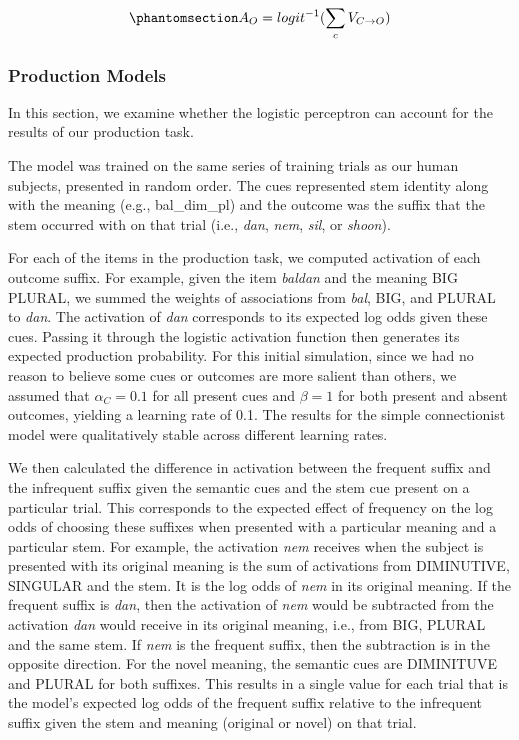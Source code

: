 \documentclass[
  letterpaper,
  DIV=11,
  numbers=noendperiod]{scrartcl}
\begin{document}
\begin{equation}\phantomsection\label{eq-rwlogistic}{
A_O = logit^{-1}(\sum_cV_{C\rightarrow O})
}\end{equation}

\subsubsection{Production Models}\label{production-models}

In this section, we examine whether the logistic perceptron can account
for the results of our production task.

The model was trained on the same series of training trials as our human
subjects, presented in random order. The cues represented stem identity
along with the meaning (e.g., bal\_dim\_pl) and the outcome was the
suffix that the stem occurred with on that trial (i.e., \emph{dan},
\emph{nem}, \emph{sil}, or \emph{shoon}).

For each of the items in the production task, we computed activation of
each outcome suffix. For example, given the item \emph{baldan} and the
meaning BIG PLURAL, we summed the weights of associations from
\emph{bal}, BIG, and PLURAL to \emph{dan}. The activation of \emph{dan}
corresponds to its expected log odds given these cues. Passing it
through the logistic activation function then generates its expected
production probability. For this initial simulation, since we had no
reason to believe some cues or outcomes are more salient than others, we
assumed that \(\alpha_C=0.1\) for all present cues and \(\beta=1\) for
both present and absent outcomes, yielding a learning rate of 0.1. The
results for the simple connectionist model were qualitatively stable
across different learning rates.

We then calculated the difference in activation between the frequent
suffix and the infrequent suffix given the semantic cues and the stem
cue present on a particular trial. This corresponds to the expected
effect of frequency on the log odds of choosing these suffixes when
presented with a particular meaning and a particular stem. For example,
the activation \emph{nem} receives when the subject is presented with
its original meaning is the sum of activations from DIMINUTIVE, SINGULAR
and the stem. It is the log odds of \emph{nem} in its original meaning.
If the frequent suffix is \emph{dan}, then the activation of \emph{nem}
would be subtracted from the activation \emph{dan} would receive in its
original meaning, i.e., from BIG, PLURAL and the same stem. If
\emph{nem} is the frequent suffix, then the subtraction is in the
opposite direction. For the novel meaning, the semantic cues are
DIMINITUVE and PLURAL for both suffixes. This results in a single value
for each trial that is the model's expected log odds of the frequent
suffix relative to the infrequent suffix given the stem and meaning
(original or novel) on that trial.
\end{document}
